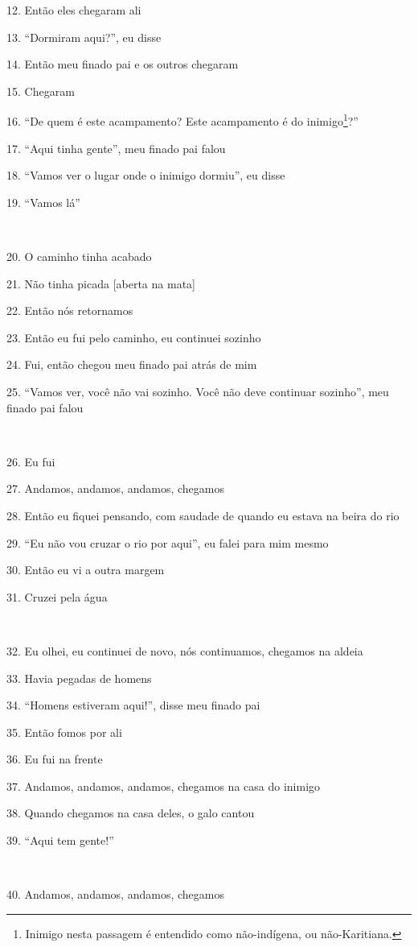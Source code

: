 12. Então eles chegaram ali

13. ``Dormiram aqui?'', eu disse

14. Então meu finado pai e os outros chegaram

15. Chegaram

16. ``De quem é este acampamento? Este acampamento é do inimigo\footnote{Inimigo
  nesta passagem é entendido como não-indígena, ou não-Karitiana.}?''

17. ``Aqui tinha gente'', meu finado pai falou

18. ``Vamos ver o lugar onde o inimigo dormiu'', eu disse

19. ``Vamos lá''

~

20. O caminho tinha acabado

21. Não tinha picada {[}aberta na mata{]}

22. Então nós retornamos

23. Então eu fui pelo caminho, eu continuei sozinho

24. Fui, então chegou meu finado pai atrás de mim

25. ``Vamos ver, você não vai sozinho. Você não deve continuar sozinho'',
meu finado pai falou

~

26. Eu fui

27. Andamos, andamos, andamos, chegamos

28. Então eu fiquei pensando, com saudade de quando eu estava na beira do
rio

29. ``Eu não vou cruzar o rio por aqui'', eu falei para mim mesmo

30. Então eu vi a outra margem

31. Cruzei pela água

~

32. Eu olhei, eu continuei de novo, nós continuamos, chegamos na aldeia

33. Havia pegadas de homens

34. ``Homens estiveram aqui!'', disse meu finado pai

35. Então fomos por ali

36. Eu fui na frente

37. Andamos, andamos, andamos, chegamos na casa do inimigo

38. Quando chegamos na casa deles, o galo cantou

39. ``Aqui tem gente!''

~

40. Andamos, andamos, andamos, chegamos

